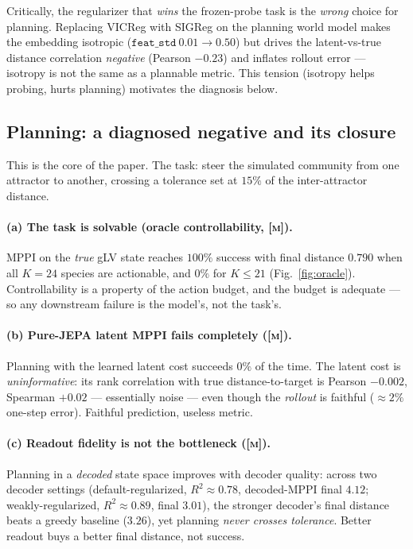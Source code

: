 \documentclass[11pt]{article}
\newcommand{\meas}{\textcolor{black}{\textsc{[m]}}}      %
\newcommand{\code}[1]{\texttt{#1}}
\begin{document}
Critically, the regularizer that \emph{wins} the frozen-probe task is the
\emph{wrong} choice for planning. Replacing VICReg with SIGReg on the planning
world model makes the embedding isotropic ($\code{feat\_std}~0.01\!\rightarrow\!0.50$)
but drives the latent-vs-true distance correlation \emph{negative}
(Pearson $-0.23$) and inflates rollout error --- isotropy is not the same as a
plannable metric. This tension (isotropy helps probing, hurts planning)
motivates the diagnosis below.

\subsection{Planning: a diagnosed negative and its closure}
\label{sec:planning}
This is the core of the paper. The task: steer the simulated community from one
attractor to another, crossing a tolerance set at $15\%$ of the inter-attractor
distance.

\paragraph{(a) The task is solvable (oracle controllability, \meas).}
MPPI on the \emph{true} gLV state reaches $100\%$ success with final distance
$0.790$ when all $K{=}24$ species are actionable, and $0\%$ for $K\le21$
(Fig.~\ref{fig:oracle}). Controllability is a property of the action budget, and
the budget is adequate --- so any downstream failure is the model's, not the
task's.

\paragraph{(b) Pure-JEPA latent MPPI fails completely (\meas).}
Planning with the learned latent cost succeeds $0\%$ of the time. The latent
cost is \emph{uninformative}: its rank correlation with true distance-to-target
is Pearson $-0.002$, Spearman $+0.02$ --- essentially noise --- even though the
\emph{rollout} is faithful ($\approx2\%$ one-step error). Faithful prediction,
useless metric.

\paragraph{(c) Readout fidelity is not the bottleneck (\meas).}
Planning in a \emph{decoded} state space improves with decoder quality: across
two decoder settings (default-regularized, $R^2\!\approx\!0.78$, decoded-MPPI
final $4.12$; weakly-regularized, $R^2\!\approx\!0.89$, final $3.01$), the
stronger decoder's final distance beats a greedy baseline ($3.26$), yet planning
\emph{never crosses tolerance}. Better readout buys a better final distance, not
success.
\end{document}
